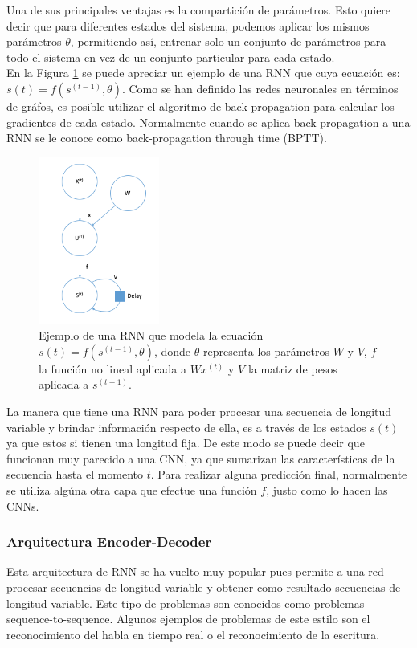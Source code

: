 Una de sus principales ventajas es la compartición de parámetros. Esto quiere decir que para diferentes estados del sistema, podemos aplicar los mismos parámetros $\theta$, permitiendo así, entrenar solo un conjunto de parámetros para todo el sistema en vez de un conjunto particular para cada estado. \\

En la Figura \ref{fig:rnn} se puede apreciar un ejemplo de una RNN que cuya ecuación es: $s(t) = f(s^{(t-1)}, \theta)$. Como se han definido las redes neuronales en términos de gráfos, es posible utilizar el algoritmo de back-propagation para calcular los gradientes de cada estado. Normalmente cuando se aplica back-propagation a una RNN se le conoce como back-propagation through time (BPTT). \\

\begin{figure}[H]
	\centering
	\includegraphics[width=4cm, height=5.5cm]{capitulo2/images/rnn}
	\caption{Ejemplo de una RNN que modela la ecuación $s(t) = f(s^{(t-1)}, \theta)$, donde $\theta$ representa los parámetros $W$ y $V$, $f$ la función no lineal aplicada a $Wx^{(t)}$ y $V$ la matriz de pesos aplicada a $s^{(t-1)}$.}
	\label{fig:rnn}
\end{figure}

La manera que tiene una RNN para poder procesar una secuencia de longitud variable y brindar información respecto de ella, es a través de los estados $s(t)$ ya que estos si tienen una longitud fija. De este modo se puede decir que funcionan muy parecido a una CNN, ya que sumarizan las características de la secuencia hasta el momento $t$. Para realizar alguna predicción final, normalmente se utiliza algúna otra capa que efectue una función $f$, justo como lo hacen las CNNs. \\
  
    \subsubsection{Arquitectura Encoder-Decoder}
    Esta arquitectura de RNN se ha vuelto muy popular pues permite a una red procesar secuencias de longitud variable y obtener como resultado secuencias de longitud variable. Este tipo de problemas son conocidos como problemas sequence-to-sequence. Algunos ejemplos de problemas de este estilo son el reconocimiento del habla en tiempo real o el reconocimiento de la escritura. \\
    
